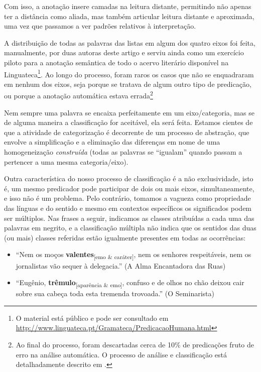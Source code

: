\documentclass[portuguese]{textolivre}
\begin{document}
Com isso, a anotação insere camadas na leitura distante, permitindo não apenas ter a distância como aliada, mas também articular leitura distante e aproximada, uma vez que passamos a ver padrões relativos à interpretação.  

A distribuição de todas as palavras das listas em algum dos quatro eixos foi feita, manualmente, por duas autoras deste artigo e serviu ainda como um exercício piloto para a anotação semântica de todo o acervo literário disponível na Linguateca\footnote{O material está público e pode ser consultado em \url{http://www.linguateca.pt/Gramateca/PredicacaoHumana.html}}. Ao longo do processo, foram raros os casos que não se enquadraram em nenhum dos eixos, seja porque se tratava de algum outro tipo de predicação, ou porque a anotação automática estava errada\footnote{Ao final do processo, foram descartadas cerca de 10\% de predicações fruto de erro na análise automática. O processo de análise e classificação está detalhadamente descrito em \textcite{silva2021}.}

Nem sempre uma palavra se encaixa perfeitamente em um eixo/categoria, mas se de alguma maneira a classificação for aceitável, ela será feita. Estamos cientes de que a atividade de categorização é decorrente de um processo de abstração, que envolve a simplificação e a eliminação das diferenças em nome de uma homogeneização \textit{construída} (todas as palavras se “igualam” quando passam a pertencer a uma mesma categoria/eixo).

Outra característica do nosso processo de classificação é a não exclusividade, isto é, um mesmo predicador pode participar de dois ou mais eixos, simultaneamente, e isso não é um problema. Pelo contrário, tomamos a vagueza como propriedade das línguas e do sentido e mesmo em contextos específicos os significados podem ser múltiplos. Nas frases a seguir, indicamos as classes atribuídas a cada uma das palavras em negrito, e a classificação múltipla não indica que os sentidos das duas (ou mais) classes referidas estão igualmente presentes em todas as ocorrências:

\begin{itemize}
    \item “Nem os moços \textbf{valentes}\textsubscript{[emo \& caráter]}, nem os senhores respeitáveis, nem os jornalistas vão sequer à delegacia.” (A Alma Encantadora das Ruas)
    \item “Eugênio, \textbf{trêmulo}\textsubscript{[aparência \& emo]}, confuso e de olhos no chão deixou cair sobre sua cabeça toda esta tremenda trovoada.” (O Seminarista)
\end{itemize}
\end{document}
